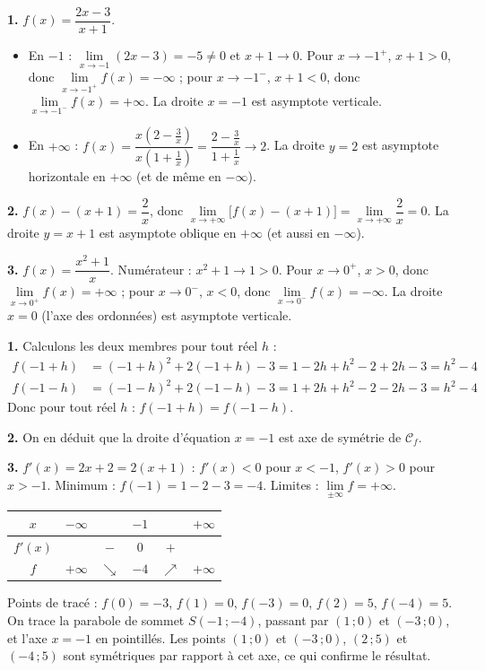 \documentclass[11pt]{article}
\newcommand{\cle}[1]{{\popxbold\color{popdark}#1}}
\newcounter{popsec}
\newcounter{popsub}
\newcommand{\courssub}[1]{%
  \stepcounter{popsub}%
  \par\vspace{9pt}\noindent{\popxbold\fontsize{11.5}{13}\selectfont\color{popink}{\color{poporange}\thepopsec.\thepopsub}\hspace{6pt}#1}\par\nopagebreak\vspace{4pt}
}
\begin{document}
\begin{corrige}
\textbf{1.} $f(x)=\dfrac{2x-3}{x+1}$.
\begin{itemize}
\item En $-1$ : $\lim\limits_{x\to -1}(2x-3)=-5\neq 0$ et $x+1\to 0$. Pour $x\to -1^+$, $x+1>0$, donc $\lim\limits_{x\to -1^+}f(x)=-\infty$ ; pour $x\to -1^-$, $x+1<0$, donc $\lim\limits_{x\to -1^-}f(x)=+\infty$. La droite $\boxed{x=-1}$ est \cle{asymptote verticale}.
\item En $+\infty$ : $f(x)=\dfrac{x(2-\frac3x)}{x(1+\frac1x)}=\dfrac{2-\frac3x}{1+\frac1x}\to 2$. La droite $\boxed{y=2}$ est \cle{asymptote horizontale} en $+\infty$ (et de même en $-\infty$).
\end{itemize}

\textbf{2.} $f(x)-(x+1)=\dfrac{2}{x}$, donc $\lim\limits_{x\to+\infty}\bigl[f(x)-(x+1)\bigr]=\lim\limits_{x\to+\infty}\dfrac{2}{x}=0$. La droite $\boxed{y=x+1}$ est \cle{asymptote oblique} en $+\infty$ (et aussi en $-\infty$).

\textbf{3.} $f(x)=\dfrac{x^2+1}{x}$. Numérateur : $x^2+1\to 1>0$. Pour $x\to 0^+$, $x>0$, donc $\lim\limits_{x\to 0^+}f(x)=+\infty$ ; pour $x\to 0^-$, $x<0$, donc $\lim\limits_{x\to 0^-}f(x)=-\infty$. La droite $\boxed{x=0}$ (l'axe des ordonnées) est \cle{asymptote verticale}.
\end{corrige}

\courssub{Axe et centre de symétrie}

\begin{corrige}
\textbf{1.} Calculons les deux membres pour tout réel $h$ :
\begin{align*}
f(-1+h)&=(-1+h)^2+2(-1+h)-3=1-2h+h^2-2+2h-3=h^2-4\\
f(-1-h)&=(-1-h)^2+2(-1-h)-3=1+2h+h^2-2-2h-3=h^2-4
\end{align*}
Donc pour tout réel $h$ : $f(-1+h)=f(-1-h)$.

\textbf{2.} On en déduit que la droite d'équation $\boxed{x=-1}$ est \cle{axe de symétrie} de $\mathcal{C}_f$.

\textbf{3.} $f'(x)=2x+2=2(x+1)$ : $f'(x)<0$ pour $x<-1$, $f'(x)>0$ pour $x>-1$. Minimum : $f(-1)=1-2-3=-4$. Limites : $\lim\limits_{\pm\infty}f=+\infty$.

\begin{center}
\begin{tabular}{|c|ccccc|}\hline
$x$ & $-\infty$ & & $-1$ & & $+\infty$ \\ \hline
$f'(x)$ & & $-$ & $0$ & $+$ & \\ \hline
$f$ & $+\infty$ & $\searrow$ & $-4$ & $\nearrow$ & $+\infty$ \\ \hline
\end{tabular}
\end{center}

Points de tracé : $f(0)=-3$, $f(1)=0$, $f(-3)=0$, $f(2)=5$, $f(-4)=5$. On trace la parabole de sommet $S(-1\,;-4)$, passant par $(1\,;0)$ et $(-3\,;0)$, et l'axe $x=-1$ en pointillés. Les points $(1\,;0)$ et $(-3\,;0)$, $(2\,;5)$ et $(-4\,;5)$ sont symétriques par rapport à cet axe, ce qui confirme le résultat.
\end{corrige}
\end{document}
